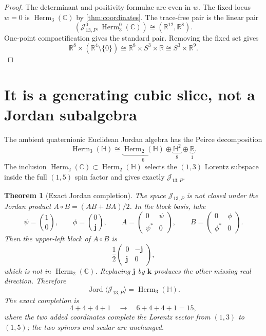\documentclass[11pt]{article}
\newtheorem{theorem}{Theorem}[section]
\theoremstyle{definition}
\theoremstyle{remark}
\newcommand{\C}{\mathbb C}
\newcommand{\Hh}{\mathbb H}
\newcommand{\R}{\mathbb R}
\newcommand{\Herm}{\operatorname{Herm}}
\newcommand{\cJ}{\mathcal J}
\newcommand{\bj}{\mathbf j}
\newcommand{\bk}{\mathbf k}
\begin{document}
\begin{proof}
The determinant and positivity formulae are even in $w$.  The fixed locus $w=0$ is $\Herm_3(\C)$ by \cref{thm:coordinates}.  The trace-free pair is the linear pair
\[
 (\cJ_{13,P}^0,\Herm_3^0(\C))\cong(\R^{12},\R^8).
\]
One-point compactification gives the standard pair.  Removing the fixed set gives
\[
 \R^8\times(\R^4\setminus\{0\})
 \cong\R^8\times S^3\times\R
 \cong S^3\times\R^9.
\]
\end{proof}

\section{It is a generating cubic slice, not a Jordan subalgebra}

The ambient quaternionic Euclidean Jordan algebra has the Peirce decomposition
\begin{equation}\label{eq:H3H-Peirce}
 \Herm_3(\Hh)
 \cong
 \underbrace{\Herm_2(\Hh)}_{6}
 \oplus
 \underbrace{\Hh^2}_{8}
 \oplus
 \underbrace{\R}_{1}.
\end{equation}
The inclusion $\Herm_2(\C)\subset\Herm_2(\Hh)$ selects the $(1,3)$ Lorentz subspace inside the full $(1,5)$ spin factor and gives exactly $\cJ_{13,P}$.

\begin{theorem}[Exact Jordan completion]\label{thm:Jordan-closure}
The space $\cJ_{13,P}$ is not closed under the Jordan product
$A\circ B=(AB+BA)/2$.  In the block basis, take
\[
 \psi=\binom10,
 \qquad
 \phi=\binom0{\bj},
 \qquad
 A=\begin{pmatrix}0&\psi\\\psi^*&0\end{pmatrix},
 \qquad
 B=\begin{pmatrix}0&\phi\\\phi^*&0\end{pmatrix}.
\]
Then the upper-left block of $A\circ B$ is
\begin{equation}\label{eq:nonclosure}
 \frac12
 \begin{pmatrix}0&-\bj\\\bj&0\end{pmatrix},
\end{equation}
which is not in $\Herm_2(\C)$.  Replacing $\bj$ by $\bk$ produces the other missing real direction.  Therefore
\begin{equation}\label{eq:Jordan-closure}
 \boxed{
 \operatorname{Jord}\langle\cJ_{13,P}\rangle
 =\Herm_3(\Hh).}
\end{equation}
The exact completion is
\begin{equation}\label{eq:15-completion}
 4+4+4+1
 \quad\longrightarrow\quad
 6+4+4+1=15,
\end{equation}
where the two added coordinates complete the Lorentz vector from $(1,3)$ to $(1,5)$; the two spinors and scalar are unchanged.
\end{theorem}
\end{document}

